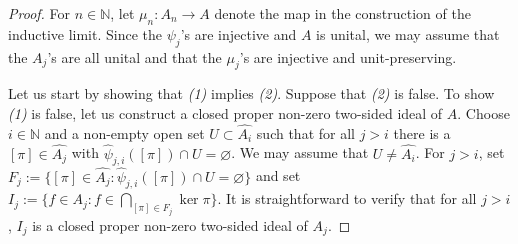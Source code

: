 \documentclass[12pt]{amsart}
\numberwithin{equation}{section}
\newtheorem{claim}{Claim}[theorem]
\theoremstyle{definition}
\theoremstyle{remark}
\newcommand{\NN}{\mathbb{N}}
\begin{document}
\begin{proof}
	For $n\in\NN$, let $\mu_{n}\colon A_{n}\to A$ denote the map in the construction of the inductive limit. Since the $\psi_{j}$'s are injective and $A$ is unital, we may assume that the $A_{j}$'s are all unital and that the $\mu_{j}$'s are injective and unit-preserving.
	
	Let us start by showing that \textit{(1)} implies \textit{(2)}. Suppose that \textit{(2)} is false. To show \textit{(1)} is false, let us construct a closed proper non-zero two-sided ideal of $A$. Choose $i\in\mathbb{N}$ and a non-empty open set $U\subset \hat{A_{i}}$ such that for all $j > i$ there is a $[\pi]\in\hat{A_{j}}$ with $\hat{\psi}_{j,i}([\pi])\cap U=\varnothing$. We may assume that $U\not=\hat{A_{i}}$. For $j > i$, set $F_{j}:=\{[\pi]\in \hat{A_{j}}:\hat{\psi}_{j,i}([\pi])\cap U=\varnothing\}$ and set $I_{j}:=\{f\in A_{j}:f\in\bigcap_{[\pi]\in F_{j}}\ker\pi\}$. It is straightforward to verify that for all $j>i$, $I_{j}$ is a closed proper non-zero two-sided ideal of $A_{j}$.

\end{proof}
\end{document}

